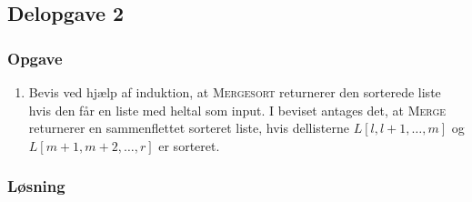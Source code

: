 \subsection{Delopgave 2}
\subsubsection{Opgave}
\begin{enumerate}
	\item Bevis ved hjælp af induktion, at \textsc{Mergesort} returnerer den sorterede liste hvis den får en liste med heltal som input. I beviset antages det, at \textsc{Merge} returnerer en sammenflettet sorteret liste, hvis dellisterne $L[l,l+1,\ldots,m]$ og $L[m+1,m+2,\ldots,r]$ er sorteret.
\end{enumerate}
\subsubsection{Løsning}